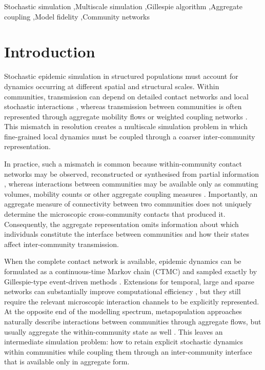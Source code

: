 \documentclass[a4paper,fleqn]{cas-sc}
\begin{document}
\begin{keywords}
Stochastic simulation \sep Multiscale simulation \sep Gillespie algorithm \sep Aggregate coupling \sep Model fidelity \sep Community networks
\end{keywords}

\maketitle

\clearpage
\section{Introduction}
\label{sec:introduction}

Stochastic epidemic simulation in structured populations must account for dynamics occurring at different spatial and structural scales. Within communities, transmission can depend on detailed contact networks and local stochastic interactions \citep{keeling2005,pastorsatorras2015,kiss2017}, whereas transmission between communities is often represented through aggregate mobility flows or weighted coupling networks \citep{balcan2009,barbosa2018human}. This mismatch in resolution creates a multiscale simulation problem in which fine-grained local dynamics must be coupled through a coarser inter-community representation.

In practice, such a mismatch is common because within-community contact networks may be observed, reconstructed or synthesised from partial information \citep{eubank2004,danon2011}, whereas interactions between communities may be available only as commuting volumes, mobility counts or other aggregate coupling measures \citep{barbosa2018human,chang2021}. Importantly, an aggregate measure of connectivity between two communities does not uniquely determine the microscopic cross-community contacts that produced it. Consequently, the aggregate representation omits information about which individuals constitute the interface between communities and how their states affect inter-community transmission.

When the complete contact network is available, epidemic dynamics can be formulated as a continuous-time Markov chain (CTMC) and sampled exactly by Gillespie-type event-driven methods \citep{gillespie1977exact,gibson2000}. Extensions for temporal, large and sparse networks can substantially improve computational efficiency \citep{vestergaard2015,kuryliak2025simulating}, but they still require the relevant microscopic interaction channels to be explicitly represented. At the opposite end of the modelling spectrum, metapopulation approaches naturally describe interactions between communities through aggregate flows, but usually aggregate the within-community state as well \citep{colizza2007reaction,colizza2008,balcan2010modeling,ajelli2010}. This leaves an intermediate simulation problem: how to retain explicit stochastic dynamics within communities while coupling them through an inter-community interface that is available only in aggregate form.
\end{document}
